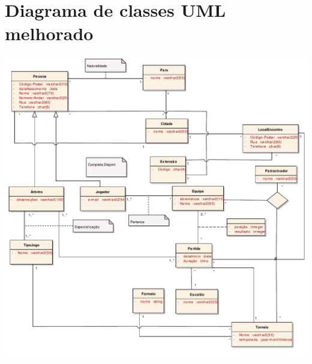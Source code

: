\documentclass[a4paper]{article}
\begin{document}
\section{Diagrama de classes UML melhorado}
\includegraphics[scale=0.70]{classModel.pdf}
\end{document}
